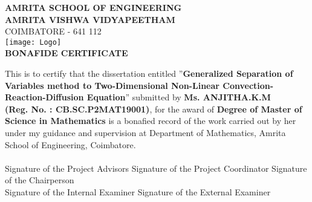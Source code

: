 \documentclass[a4paper,12pt]{article}
\numberwithin{equation}{section}
\begin{document}
\begin{titlepage}
\begin{center}
{\large{\bf{{AMRITA SCHOOL OF ENGINEERING}}}}\\
\vspace{0.2cm}
{\Large{\bf{{AMRITA VISHWA VIDYAPEETHAM}}}}\\
\vspace{0.2cm}
COIMBATORE - 641 112\\
\vspace{0.5cm}
\texttt{[image: Logo]}\\
\vspace{0.5cm}
{\Large{\bf{{BONAFIDE CERTIFICATE}}}}\\
\end{center}
This is to certify that the dissertation entitled ''{\bf{Generalized Separation of Variables method to Two-Dimensional Non-Linear Convection-Reaction-Diffusion Equation}}'' submitted by {\bf{Ms. ANJITHA.K.M}}\\
{\bf{(Reg. No. : CB.SC.P2MAT19001)}}, for the award of {\bf{Degree of Master of Science in Mathematics}} is a bonafied record of the work carried out by her under my guidance and supervision at Department of Mathematics, Amrita School of Engineering, Coimbatore.\\
\newline \\
\vspace*{2.5cm}Signature of the Project Advisors\hspace*{1.5cm} Signature of the Project Coordinator
\vspace*{2.5cm}
\hspace{4.5cm}Signature of the Chairperson\\
\vspace{2.5cm}
Signature of the Internal Examiner\hspace*{1.5cm} Signature of the External Examiner
\end{titlepage}
\end{document}
